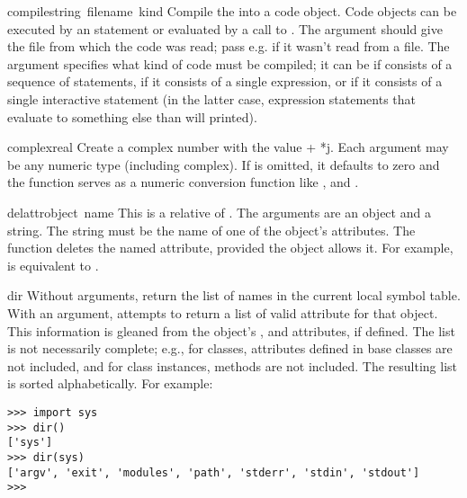 \begin{funcdesc}{compile}{string\, filename\, kind}
  Compile the  into a code object.  Code objects can be
  executed by an  statement or evaluated by a call to
  .  The  argument should
  give the file from which the code was read; pass e.g. 
  if it wasn't read from a file.  The  argument specifies
  what kind of code must be compiled; it can be  if
   consists of a sequence of statements, 
  if it consists of a single expression, or  if
  it consists of a single interactive statement (in the latter case,
  expression statements that evaluate to something else than
   will printed).
\end{funcdesc}

\begin{funcdesc}{complex}{real}
  Create a complex number with the value  + *j.
  Each argument may be any numeric type (including complex).
  If  is omitted, it defaults to zero and the function
  serves as a numeric conversion function like , 
  and .
\end{funcdesc}

\begin{funcdesc}{delattr}{object\, name}
  This is a relative of .  The arguments are an
  object and a string.  The string must be the name
  of one of the object's attributes.  The function deletes
  the named attribute, provided the object allows it.  For example,
   is equivalent to
  .
\end{funcdesc}

\begin{funcdesc}{dir}{}
  Without arguments, return the list of names in the current local
  symbol table.  With an argument, attempts to return a list of valid
  attribute for that object.  This information is gleaned from the
  object's ,  and 
  attributes, if defined.  The list is not necessarily complete; e.g.,
  for classes, attributes defined in base classes are not included,
  and for class instances, methods are not included.
  The resulting list is sorted alphabetically.  For example:

\begin{verbatim}
>>> import sys
>>> dir()
['sys']
>>> dir(sys)
['argv', 'exit', 'modules', 'path', 'stderr', 'stdin', 'stdout']
>>> 
\end{verbatim}
\end{funcdesc}


